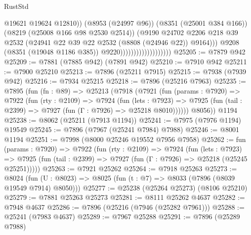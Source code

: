 \begin{lexlean}{RustStd}
\begin{coremodule}
                                                @19621
                                                @19624
                                                @12810))
                                            (@8953 (@24997 @96))
                                            (@8351 (@25001 @384 @166))
                                            (@8219 (@25008 @166 @98 @2530 @2514))
                                            (@9190
                                              @24702
                                              @2206
                                              @218
                                              @39
                                              @2532
                                              (@24941
                                                @22
                                                @39
                                                @22
                                                @2532
                                                (@8808 (@24946 @22))
                                                @9164)))
                                          @9208
                                          (@8351 (@19048 @1186 @385))
                                          @9220)))))))))))))))))))
@25205 := @7879 @942
@25209 := @7881 (@7885 @942) (@7891 @942)
@25210 := @7910 @942
@25211 := @7900 @25210
@25213 := @7896 (@25211 @7915)
@25215 := @7938 (@7939 @942)
@25216 := @7934 @25215
@25218 := @7896 (@25216 @7963)
@25235 := @7895
    (fun (fn : @89) =>
    @25213
      (@7918
        (@7921
          (fun (params : @7920) =>
          @7922
            (fun (rty : @2109) =>
            @7924
              (fun (lets : @7923) =>
              @7925 (fun (tail : @2399) => @7927 (fun (Γ : @7926) => @25218 @8010))))))
        @8056))
    @1194
@25238 := @8062 (@25211 (@7913 @1194))
@25241 := @7975 (@7976 @1194) @19549
@25245 := @7896 (@7967 (@25241 @7984) @7988)
@25246 := @8001 @1194
@25251 := @7998 (@8000 @25246 @19552 @7956 @7958)
@25262 := fun (params : @7920) =>
  @7922
    (fun (rty : @2109) =>
    @7924
      (fun (lets : @7923) =>
      @7925 (fun (tail : @2399) => @7927 (fun (Γ : @7926) => @25218 (@25245 @25251)))))
@25263 := @7921 @25262
@25264 := @7918 @25263
@25273 := @8024
    (fun (U : @8023) => @8025 (fun (t : @7) => @8033 (@7896 (@8039 @19549 @7914) @8050)))
@25277 := @25238 (@25264 @25273) (@8106 @25210)
@25279 := @7881 @25263 @25273
@25281 := @8111 @25262 @4637
@25282 := @7948 @4637
@25286 := @7896 (@25216 (@7946 (@25282 @7961)))
@25288 := @25241 (@7983 @4637)
@25289 := @7967 @25288
@25291 := @7896 (@25289 @7988)

\end{coremodule}
\end{lexlean}

